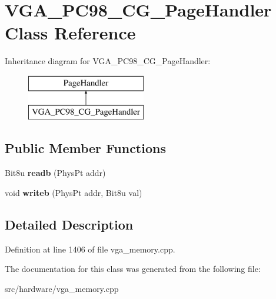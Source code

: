 \hypertarget{classVGA__PC98__CG__PageHandler}{\section{V\-G\-A\-\_\-\-P\-C98\-\_\-\-C\-G\-\_\-\-Page\-Handler Class Reference}
\label{classVGA__PC98__CG__PageHandler}
}
Inheritance diagram for V\-G\-A\-\_\-\-P\-C98\-\_\-\-C\-G\-\_\-\-Page\-Handler\-:\begin{figure}[H]
\begin{center}
\leavevmode
\includegraphics[height=2.000000cm]{classVGA__PC98__CG__PageHandler}
\end{center}
\end{figure}
\subsection*{Public Member Functions}
\begin{DoxyCompactItemize}
\item 
\hypertarget{classVGA__PC98__CG__PageHandler_aaabd662340e0d3602ab7c52643884547}{Bit8u {\bfseries readb} (Phys\-Pt addr)}\label{classVGA__PC98__CG__PageHandler_aaabd662340e0d3602ab7c52643884547}

\item 
\hypertarget{classVGA__PC98__CG__PageHandler_a87860fd23f7204a7f567477dc25d2f6f}{void {\bfseries writeb} (Phys\-Pt addr, Bit8u val)}\label{classVGA__PC98__CG__PageHandler_a87860fd23f7204a7f567477dc25d2f6f}

\end{DoxyCompactItemize}


\subsection{Detailed Description}


Definition at line 1406 of file vga\-\_\-memory.\-cpp.



The documentation for this class was generated from the following file\-:\begin{DoxyCompactItemize}
\item 
src/hardware/vga\-\_\-memory.\-cpp\end{DoxyCompactItemize}
